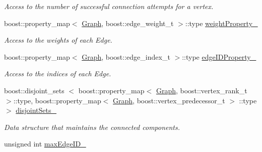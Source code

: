 \begin{DoxyCompactItemize}
\begin{DoxyCompactList}\small\item\em \-Access to the number of successful connection attempts for a vertex. \end{DoxyCompactList}\item 
\hypertarget{class_f_i_r_m_a457d816e43fdd20af3cd58c48a69505c}{boost\-::property\-\_\-map$<$ \hyperlink{class_f_i_r_m_a687e9f4243b22c30ee1fa5da22a85053}{\-Graph}, \*
boost\-::edge\-\_\-weight\-\_\-t $>$\-::type \hyperlink{class_f_i_r_m_a457d816e43fdd20af3cd58c48a69505c}{weight\-Property\-\_\-}}\label{class_f_i_r_m_a457d816e43fdd20af3cd58c48a69505c}

\begin{DoxyCompactList}\small\item\em \-Access to the weights of each \-Edge. \end{DoxyCompactList}\item 
\hypertarget{class_f_i_r_m_a573e2287409ae82f34bcee4f5738d74a}{boost\-::property\-\_\-map$<$ \hyperlink{class_f_i_r_m_a687e9f4243b22c30ee1fa5da22a85053}{\-Graph}, \*
boost\-::edge\-\_\-index\-\_\-t $>$\-::type \hyperlink{class_f_i_r_m_a573e2287409ae82f34bcee4f5738d74a}{edge\-I\-D\-Property\-\_\-}}\label{class_f_i_r_m_a573e2287409ae82f34bcee4f5738d74a}

\begin{DoxyCompactList}\small\item\em \-Access to the indices of each \-Edge. \end{DoxyCompactList}\item 
\hypertarget{class_f_i_r_m_ac7a425258d6ec9b4184c64b4eba8a24b}{boost\-::disjoint\-\_\-sets\*
$<$ boost\-::property\-\_\-map$<$ \hyperlink{class_f_i_r_m_a687e9f4243b22c30ee1fa5da22a85053}{\-Graph}, \*
boost\-::vertex\-\_\-rank\-\_\-t $>$\-::type, \*
boost\-::property\-\_\-map$<$ \hyperlink{class_f_i_r_m_a687e9f4243b22c30ee1fa5da22a85053}{\-Graph}, \*
boost\-::vertex\-\_\-predecessor\-\_\-t $>$\*
\-::type $>$ \hyperlink{class_f_i_r_m_ac7a425258d6ec9b4184c64b4eba8a24b}{disjoint\-Sets\-\_\-}}\label{class_f_i_r_m_ac7a425258d6ec9b4184c64b4eba8a24b}

\begin{DoxyCompactList}\small\item\em \-Data structure that maintains the connected components. \end{DoxyCompactList}\item 
\hypertarget{class_f_i_r_m_a517174c1ae349153df76f81f2ba2b2f1}{unsigned int \hyperlink{class_f_i_r_m_a517174c1ae349153df76f81f2ba2b2f1}{max\-Edge\-I\-D\-\_\-}}\label{class_f_i_r_m_a517174c1ae349153df76f81f2ba2b2f1}


\end{DoxyCompactItemize}
